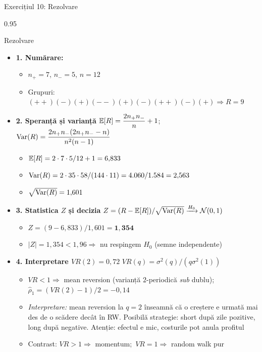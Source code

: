 \documentclass[9pt, aspectratio=169, t]{beamer}
\begin{document}
\begin{frame}[shrink=25]{Exercițiul 10: Rezolvare}
\begin{cminipage}{0.95\textwidth}
\begin{exampleblock}{Rezolvare}
\begin{itemize}\setlength{\itemsep}{0pt}
    \item \textbf{1. Numărare:}
    \begin{itemize}\setlength{\itemsep}{0pt}
        \item $n_+ = 7$, $n_- = 5$, $n = 12$
        \item Grupuri: $(++)(-)(+)(--)(+)(-)(++)(-)(+) \Rightarrow R = 9$
    \end{itemize}
    \item \textbf{2. Speranță și varianță} \quad $\mathbb{E}[R] = \dfrac{2n_+ n_-}{n} + 1$;\ $\text{Var}(R) = \dfrac{2n_+n_-(2n_+n_- - n)}{n^2(n-1)}$
    \begin{itemize}\setlength{\itemsep}{0pt}
        \item $\mathbb{E}[R] = 2 \cdot 7 \cdot 5/12 + 1 = 6{,}833$
        \item $\text{Var}(R) = 2 \cdot 35 \cdot 58/(144 \cdot 11) = 4.060/1.584 = 2{,}563$
        \item $\sqrt{\text{Var}(R)} = 1{,}601$
    \end{itemize}
    \item \textbf{3. Statistica $Z$ și decizia} \quad $Z = (R - \mathbb{E}[R])/\sqrt{\text{Var}(R)} \xrightarrow{H_0} \mathcal{N}(0,1)$
    \begin{itemize}\setlength{\itemsep}{0pt}
        \item $Z = (9 - 6{,}833)/1{,}601 = \mathbf{1{,}354}$
        \item $|Z| = 1{,}354 < 1{,}96 \Rightarrow$ nu respingem $H_0$ (semne independente)
    \end{itemize}
    \item \textbf{4. Interpretare $VR(2) = 0{,}72$} \quad $VR(q) = \sigma^2(q)/(q\sigma^2(1))$
    \begin{itemize}\setlength{\itemsep}{0pt}
        \item $VR < 1 \Rightarrow$ mean reversion (varianță $2$-periodică \emph{sub} dublu); $\hat\rho_1 = (VR(2)-1)/2 = -0{,}14$
        \item \textit{Interpretare:} mean reversion la $q = 2$ înseamnă că o creștere e urmată mai des de o scădere decât în RW. Posibilă strategie: short după zile pozitive, long după negative. Atenție: efectul e mic, costurile pot anula profitul
        \item Contrast: $VR > 1 \Rightarrow$ momentum;\ $VR = 1 \Rightarrow$ random walk pur
    \end{itemize}
\end{itemize}
\end{exampleblock}
\end{cminipage}
\end{frame}
\end{document}
